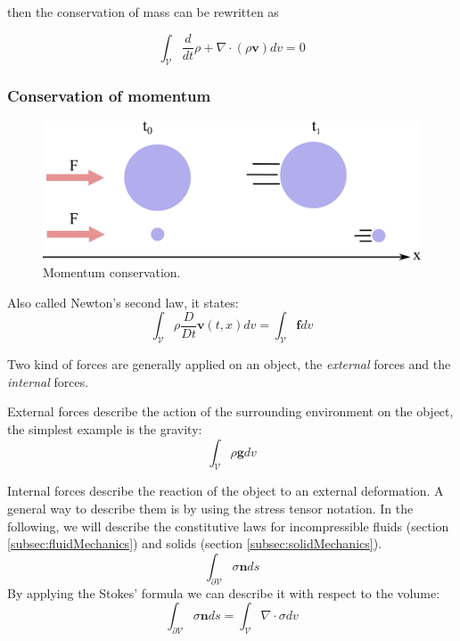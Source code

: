 then the conservation of mass can be rewritten as

\begin{equation}
\label{eq:volumetricMassConservation}
\displaystyle \int_{\mathcal{V}} \frac{d}{dt} \rho + \nabla \cdot \left( \rho  \mathbf{v} \right) dv = 0
\end{equation}

\subsubsection{Conservation of momentum}

\begin{figure}[!ht]
\centering
\includegraphics[scale=1.5]{images/continuum_mechanics/momentumConservation.png}
\caption[STAR mechanics: Momentum conservation]{\label{fig:momentumConservation} Momentum conservation.}
\end{figure}

Also called Newton's second law, it states:
\begin{equation}
\label{eq:momentumConservation}
\displaystyle \int_{\mathcal{V}} \rho \frac{D}{Dt} \mathbf{v}(t,x) dv = \int_{\mathcal{V}} \mathbf{f} dv
\end{equation}

Two kind of forces are generally applied on an object, the \emph{external} forces and the \emph{internal} forces.

External forces describe the action of the surrounding environment on the object, the simplest example is the gravity:
\begin{equation}
\displaystyle \int_{\mathcal{V}} \rho \mathbf{g} dv
\end{equation}

Internal forces describe the reaction of the object to an external deformation. A general way to describe them is by using the stress tensor notation. In the following, we will describe the constitutive laws for incompressible fluids (section \ref{subsec:fluidMechanics}) and solids (section \ref{subsec:solidMechanics}).
\begin{equation}
\displaystyle \int_{\partial \mathcal{V}} \sigma \mathbf{n} ds
\end{equation}
By applying the Stokes' formula we can describe it with respect to the volume:
\begin{equation}
\displaystyle 
\int_{\mathcal{\partial V}} \sigma \mathbf{n} ds =
\int_{\mathcal{V}} \nabla \cdot \sigma dv
\end{equation}

